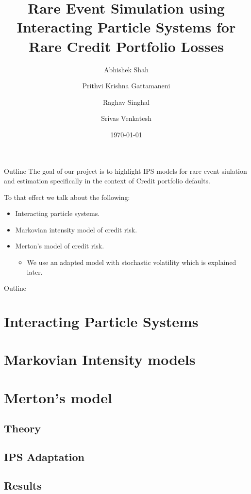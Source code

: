 \documentclass{beamer}
\title{Rare Event Simulation using Interacting Particle Systems for Rare Credit Portfolio Losses}
\author{
  Abhishek Shah \\
  \and
  Prithvi Krishna Gattamaneni\\
  \and
  Raghav Singhal\\
  \and
  Srivas Venkatesh \\
}
\institute[New York University] %
{
  Courant Institute of Mathematical Sciences\\
  New York University\\
}
\date{\today}
\begin{document}
\begin{frame}
	\titlepage
\end{frame}


\begin{frame}{Outline}
	The goal of our project is to highlight IPS models for rare event siulation
	and estimation specifically in the context of Credit portfolio defaults.
																
	To that effect we talk about the following:
	\begin{itemize}
		\item Interacting particle systems.
		\item Markovian intensity model of credit risk.
		\item Merton's model of credit risk.
		      \begin{itemize}
		      	\item We use an adapted model with stochastic volatility which
		      	      is explained later.
		      \end{itemize}
	\end{itemize}
\end{frame}

\begin{frame}{Outline}
	\tableofcontents
\end{frame}

\section{Interacting Particle Systems}
\section{Markovian Intensity models}
\section{Merton's model}
\subsection{Theory}

\subsection{IPS Adaptation}

\subsection{Results}

\end{document}
